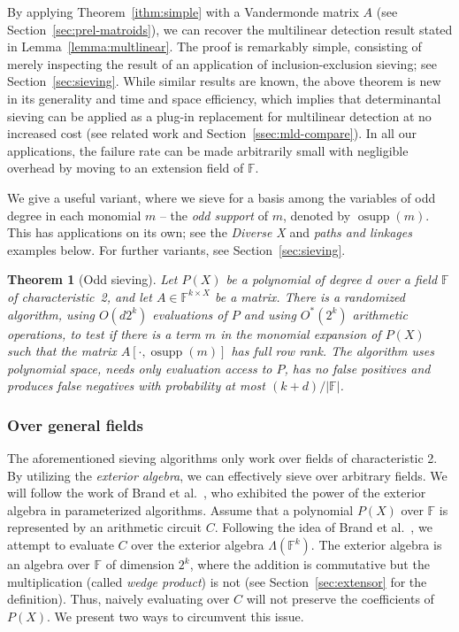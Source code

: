 \documentclass[10pt,a4paper]{article}
\newtheorem{theorem}{Theorem}[section]
\newcommand{\F}{\ensuremath{\mathbb F}\xspace}
\DeclareMathOperator{\osupp}{osupp}
\begin{document}
By applying Theorem~\ref{ithm:simple} with a Vandermonde matrix $A$ (see Section~\ref{sec:prel-matroids}), we can recover the multilinear detection result stated in Lemma~\ref{lemma:multlinear}.
The proof is remarkably simple, consisting of merely inspecting the
result of an application of inclusion-exclusion sieving; see Section~\ref{sec:sieving}. 
While similar results are known, the above theorem is new in its
generality and time and space efficiency, which implies that
determinantal sieving can be applied as a plug-in replacement 
for multilinear detection at no increased cost (see related work
and Section~\ref{ssec:mld-compare}).
In all our applications, the failure rate can be made
arbitrarily small with negligible overhead by moving to an extension field of $\F$.

We give a useful variant, where we sieve for a basis among the variables
of odd degree in each monomial $m$  -- the \emph{odd support} of $m$, denoted by $\osupp(m)$.
This has applications on its own; see the
\emph{Diverse X} and \emph{paths and linkages} examples below.
For further variants,
see Section~\ref{sec:sieving}.


\begin{theorem}[Odd sieving] \label{ithm:odd-sieve}
  Let $P(X)$
  be a polynomial of degree $d$ over a field $\F$ of characteristic~2, 
  and let $A \in \F^{k \times X}$ be a
  matrix. There is a randomized algorithm,
  using $O(d2^k)$ evaluations of $P$ and using $O^*(2^k)$ arithmetic operations, to test if there is a 
  term $m$ in the monomial expansion of $P(X)$ such that the 
  matrix $A[\cdot, \osupp(m)]$ has full row rank.
  The algorithm uses polynomial space, needs only evaluation access to $P$,
  has no false positives and produces false negatives with probability
  at most $(k+d)/|\F|$.
\end{theorem}

\subsubsection{Over general fields}

The aforementioned sieving algorithms only work over fields of characteristic 2.
By utilizing the \emph{exterior algebra}, we can effectively sieve over arbitrary fields.
We will follow the work of Brand et al.~\cite{BrandDH18}, who exhibited the power of the exterior algebra in parameterized algorithms.
Assume that a polynomial $P(X)$ over $\F$ is represented by an arithmetic circuit $C$.
Following the idea of Brand et al.~\cite{BrandDH18}, we attempt to evaluate $C$ over the exterior algebra $\Lambda(\F^k)$.
The exterior algebra is an algebra over $\F$ of dimension $2^k$, where
the addition is commutative but the multiplication (called \emph{wedge product}) is not (see Section~\ref{sec:extensor} for the definition).
Thus, naively evaluating over $C$ will not preserve the coefficients of $P(X)$.
We present two ways to circumvent this issue.
\end{document}

